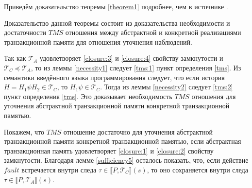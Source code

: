 Приведём доказательство теоремы \ref{theorem1} подробнее, чем в источнике \cite{tms_article}.
\begin{mproof}
Доказательство данной теоремы состоит из доказательства необходимости и достаточности $TMS$ отношения между абстрактной и конкретной реализациями транзакционной памяти для отношения уточнения наблюдений.

Так как $\mathcal{T}_A$ удовлетворяет \ref{closure:3} и \ref{closure:4} свойству замкнутости и $\mathcal{T}_C \preceq \mathcal{T}_A$, то из леммы \ref{necessity1} следует \ref{tms:1} пункт определения \ref{tms}. Из семантики введённого языка программирования следует, что если история $H = H_1\psi{H_2} \in \mathcal{T}_C$, то $H_1\psi \in \mathcal{T}_C$. Тогда из леммы \ref{necessity2} следует \ref{tms:2} пункт определения \ref{tms}. 
Это доказывает необходимость $TMS$ отношения для уточнения абстрактной транзакционной памяти конкретной транзакционной памятью.

Покажем, что $TMS$ отношение достаточно для уточнения абстрактной транзакционной памяти конкретной транзакционной памятью, если абстрактная транзакционная память удовлетворяет \ref{closure:1} и \ref{closure:2} свойству замкнутости. Благодаря лемме \ref{sufficiency5} осталось показать, что, если действие $fault$ встречается внутри следа $\tau \in \llbracket P, \mathcal{T}_C \rrbracket(s)$, то оно сохраняется внутри следа $\tau \in \llbracket P, \mathcal{T}_A \rrbracket(s)$.  


\end{mproof}
